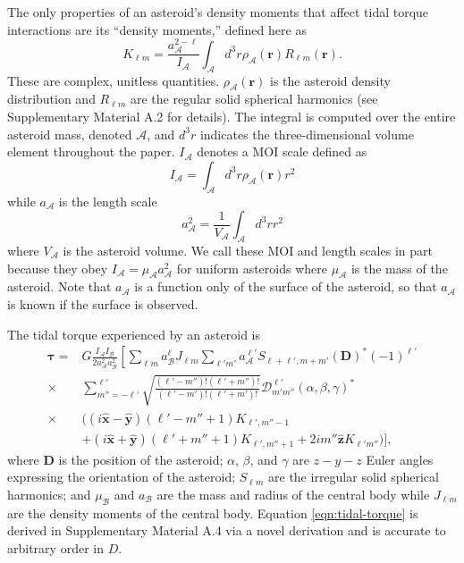 \documentclass[fleqn,usenatbib]{mnras}
\newcommand{\unit}[1]{\bm{\hat{#1}}}
\begin{document}
The only properties of an asteroid's density moments that affect tidal torque interactions are its ``density moments,'' defined here as
\begin{equation}
  K_{\ell m} = \frac{a_\mathcal{A}^{2-\ell}}{I_\mathcal{A}} \int_\mathcal{A} d^3 r \rho_\mathcal{A}(\bm r) R_{\ell m}(\bm r).
  \label{eqn:klm}
\end{equation}
These are complex, unitless quantities. $\rho_\mathcal{A}(\bm r)$ is the asteroid density distribution and $R_{\ell m}$ are the regular solid spherical harmonics (see Supplementary Material A.2 for details). The integral is computed over the entire asteroid mass, denoted $\mathcal{A}$, and $d^3 r$ indicates the three-dimensional volume element throughout the paper. $I_\mathcal{A}$ denotes a MOI scale defined as 
\begin{equation}
  I_\mathcal{A} = \int_\mathcal{A} d^3 r \rho_\mathcal{A}(\bm r) r^2
  \label{eqn:ia}
\end{equation}
while $a_\mathcal{A}$ is the length scale
\begin{equation}
  a_\mathcal{A}^2 = \frac{1}{V_\mathcal{A}} \int_\mathcal{A} d^3 r r^2
  \label{eqn:aa}
\end{equation}
where $V_\mathcal{A}$ is the asteroid volume. We call these MOI and length scales in part because they obey $I_\mathcal{A} = \mu_\mathcal{A} a_\mathcal{A}^2$ for uniform asteroids where $\mu_\mathcal{A}$ is the mass of the asteroid. Note that $a_\mathcal{A}$ is a function only of the surface of the asteroid, so that $a_\mathcal{A}$ is known if the surface is observed.

The tidal torque experienced by an asteroid is 
\begin{equation}
  \begin{split}
  \bm \tau = & G\frac{I_\mathcal{A}I_\mathcal{B}}{2 a_\mathcal{A}^2a_\mathcal{B}^2}\left[\sum_{\ell m} a_\mathcal{B}^\ell J_{\ell m} \sum_{\ell' m'}a_\mathcal{A}^{\ell'}S_{\ell+\ell', m + m'} (\bm D)^* (-1)^{\ell'}\right.\\
  \times & \left.\sum_{m''=-\ell'}^{\ell'} \sqrt{\frac{(\ell'-m'')!(\ell'+m'')!}{(\ell'-m')!(\ell'+m')!}}  \mathcal{D}^{\ell'}_{m'm''}(\alpha, \beta, \gamma)^* \right. \\
  \times & \Big((i\unit x - \unit y)(\ell'-m''+1)K_{\ell',m''-1} \\
  & +(i\unit x+\unit y)(\ell'+m''+1)K_{\ell',m''+1}+2im''\unit z K_{\ell'm''}\Big) \Bigg],
  \end{split}
  \label{eqn:tidal-torque}
\end{equation}
where $\bm D$ is the position of the asteroid; $\alpha$, $\beta$, and $\gamma$ are $z-y-z$ Euler angles expressing the orientation of the asteroid; $S_{\ell m}$ are the irregular solid spherical harmonics; and $\mu_\mathcal{B}$ and $a_\mathcal{B}$ are the mass and radius of the central body while $J_{\ell m}$ are the density moments of the central body. Equation \ref{eqn:tidal-torque} is derived in Supplementary Material A.4 via a novel derivation and is accurate to arbitrary order in $D$.
\end{document}

